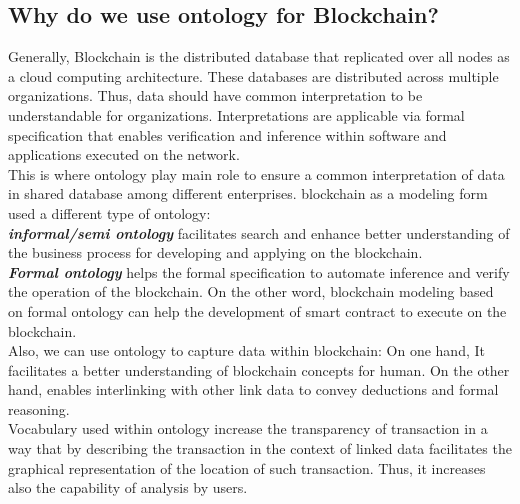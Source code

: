 \subsection{Why do we use ontology for Blockchain?}
Generally, Blockchain is the distributed database that replicated over all nodes as a cloud computing architecture. These databases are distributed across multiple organizations. Thus, data should have common interpretation to be understandable for organizations. Interpretations are applicable via formal specification that enables verification and inference within software and applications executed on the network. \\
This is where ontology play main role to ensure a common interpretation of data in shared database among different enterprises.
blockchain as a modeling form used a different type of ontology: \\
\textbf{\textit{informal/semi ontology}} facilitates search and enhance better understanding of the business process for developing and applying on the blockchain.\\
\textbf{\textit{Formal ontology}} helps the formal specification to automate inference and verify the operation of the blockchain. On the other word, blockchain modeling based on formal ontology can help the development of smart contract to execute on the blockchain.\\
Also, we can use ontology to capture data within blockchain: On one hand, It facilitates a better understanding of blockchain concepts for human. On the other hand, enables interlinking with other link data to convey deductions and formal reasoning\cite{Kim}.\\
Vocabulary used within ontology increase the transparency of transaction in a way that by describing the transaction in the context of linked data facilitates the graphical representation of the location of such transaction. Thus, it increases also the capability of analysis by users\cite{Kim}.


